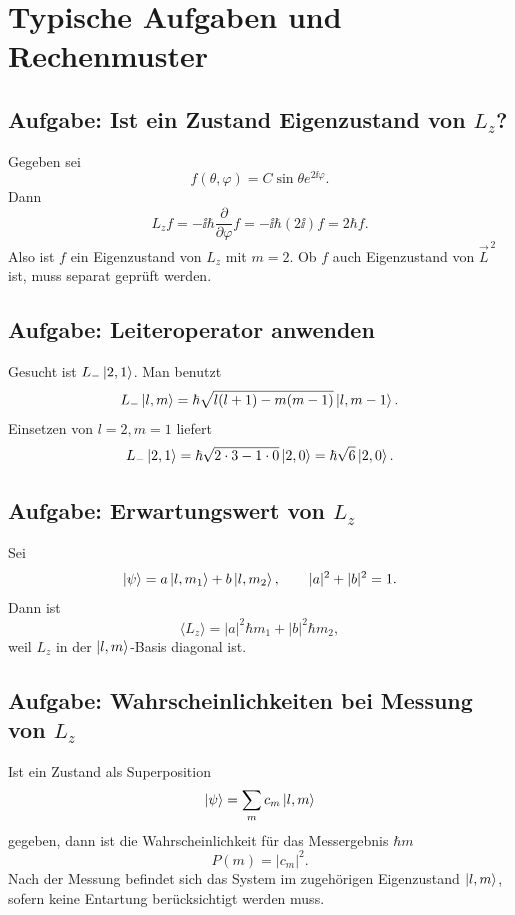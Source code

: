 \section{Typische Aufgaben und Rechenmuster}

\subsection{Aufgabe: Ist ein Zustand Eigenzustand von \(L_z\)?}

\begin{examplebox}
Gegeben sei
\[
    f(\theta,\varphi)=C\sin\theta e^{2\ii\varphi}.
\]
Dann
\[
    L_z f=-\ii\hbar\frac{\partial}{\partial\varphi}f
    =-\ii\hbar(2\ii)f=2\hbar f.
\]
Also ist \(f\) ein Eigenzustand von \(L_z\) mit \(m=2\). Ob \(f\) auch Eigenzustand von \(\vec L^{\,2}\) ist, muss separat geprüft werden.
\end{examplebox}

\subsection{Aufgabe: Leiteroperator anwenden}

\begin{examplebox}
Gesucht ist \(L_-\left|2,1\right\rangle\). Man benutzt
\[
    L_-\left|l,m\right\rangle
    =\hbar\sqrt{l(l+1)-m(m-1)}\left|l,m-1\right\rangle.
\]
Einsetzen von \(l=2,m=1\) liefert
\[
    L_-\left|2,1\right\rangle
    =\hbar\sqrt{2\cdot 3-1\cdot 0}\left|2,0\right\rangle
    =\hbar\sqrt6\left|2,0\right\rangle.
\]
\end{examplebox}

\subsection{Aufgabe: Erwartungswert von \(L_z\)}

Sei
\[
    \left|\psi\right\rangle=a\left|l,m_1\right\rangle+b\left|l,m_2\right\rangle,
    \qquad
    |a|^2+|b|^2=1.
\]
Dann ist
\[
    \langle L_z\rangle
    =|a|^2\hbar m_1+|b|^2\hbar m_2,
\]
weil \(L_z\) in der \(\left|l,m\right\rangle\)-Basis diagonal ist.

\subsection{Aufgabe: Wahrscheinlichkeiten bei Messung von \(L_z\)}

Ist ein Zustand als Superposition
\[
    \left|\psi\right\rangle=\sum_m c_m\left|l,m\right\rangle
\]
gegeben, dann ist die Wahrscheinlichkeit für das Messergebnis \(\hbar m\)
\[
    P(m)=|c_m|^2.
\]
Nach der Messung befindet sich das System im zugehörigen Eigenzustand \(\left|l,m\right\rangle\), sofern keine Entartung berücksichtigt werden muss.


